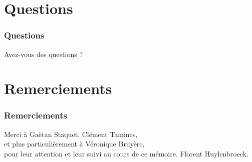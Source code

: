 \documentclass{beamer}
\begin{document}
\section{Questions}
\begin{frame}
\frametitle{Questions}
Avez-vous des questions ?
\end{frame}

\section*{Remerciements}
\begin{frame}
\frametitle{Remerciements}
Merci à Gaëtan Staquet, Clément Tamines,\\
et plus particulièrement à Véronique Bruyère,\\
pour leur attention et leur suivi au cours de ce mémoire.
\vfill
\hfill Florent Huylenbroeck.
\end{frame}
\end{document}
